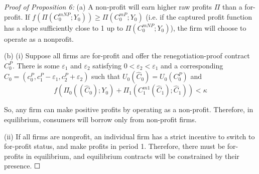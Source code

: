 \documentclass[11pt,english]{article}
\theoremstyle{plain}
\theoremstyle{definition}
\begin{document}
\emph{Proof of Proposition 6:} (a) A non-profit will earn
higher raw profits $\Pi$ than a for-profit. If $f\left(\Pi\left(C_{0}^{mNP};Y_{0}\right)\right)\geq\Pi\left(C_{0}^{mP};Y_{0}\right)$
(i.e. if the captured profit function has a slope sufficiently close
to 1 up to $\Pi\left(C_{0}^{mNP};Y_{0}\right)$), the firm will choose
to operate as a nonprofit.

(b) (i) Suppose all firms are for-profit and offer the renegotiation-proof
contract $C_{0}^{P}$. There is some $\varepsilon_{1}$ and $\varepsilon_{2}$
satisfying $0<\varepsilon_{2}<\varepsilon_{1}$ and a corresponding
$\hat{C}_{0}=\left(c_{0}^{P},c_{1}^{P}-\varepsilon_{1},c_{2}^{P}+\varepsilon_{2}\right)$
such that $U_{0}\left(\hat{C}_{0}\right)=U_{0}\left(C_{0}^{P}\right)$
and 
\[
f\left(\Pi_{0}\left(\left(\hat{C}_{0}\right);Y_{0}\right)+\Pi_{1}\left(C_{1}^{m1}\left(\hat{C}_{1}\right);\hat{C}_{1}\right)\right)<\kappa
\]

So, any firm can make positive profits by operating as a non-profit.
Therefore, in equilibrium, consumers will borrow only from non-profit
firms. 

(ii) If all firms are nonprofit, an individual firm has a strict incentive
to switch to for-profit status, and make profits in period 1. Therefore,
there must be for-profits in equilibrium, and equilibrium contracts
will be constrained by their presence. $\Square$



\end{document}
